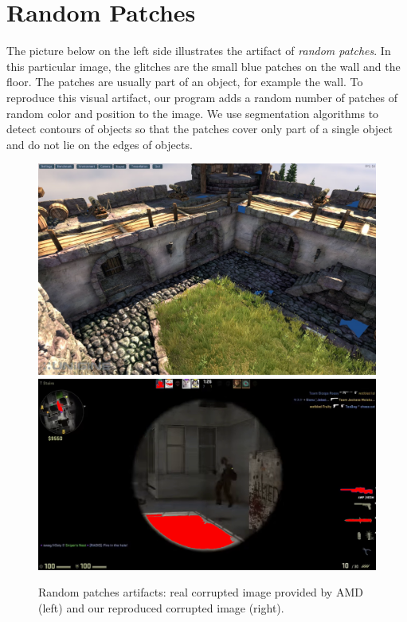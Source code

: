 \section*{Random Patches}
The picture below on the left side illustrates the artifact of \textit{random patches}. In this particular image, the glitches are the small blue patches on the wall and the floor. The patches are usually part of an object, for example the wall. To reproduce this visual artifact, our program adds a random number of patches of random color and position to the image. We use segmentation algorithms \cite{watershed} to detect contours of objects so that the patches cover only part of a single object and do not lie on the edges of objects.

\begin{figure}[!ht]
\includegraphics[scale=0.128]{images/rp1.jpg}
\includegraphics[scale=0.16]{images/rp2.png}
\vspace{5pt}
\caption[Random patches artifacts]{Random patches artifacts: real corrupted image provided by AMD (left) and our reproduced corrupted image (right).}
\label{fig:rp}
\end{figure}

